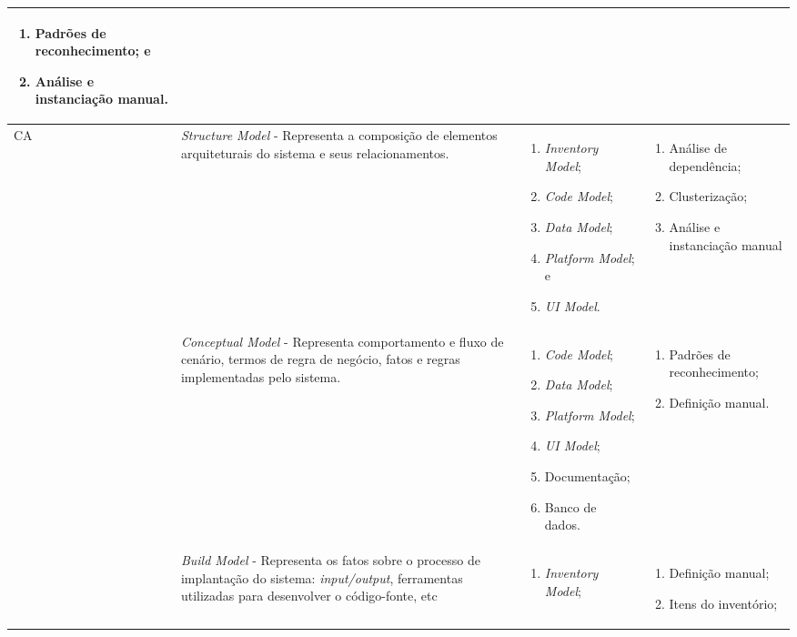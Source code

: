 \begin{longtable}{ | m{2.5cm} | m{5.9cm}| m{3.5cm} | m{3.5cm} | }
\begin{enumerate}
 	\item Padrões de reconhecimento; e
 	\item Análise e instanciação manual.
 \end{enumerate} \tabularnewline
\hline 
\multirow{3}{2.5cm}{CA} & \emph{Structure Model} \newline - Representa a composição de elementos arquiteturais do sistema e seus relacionamentos.  & \begin{enumerate}
	\item \emph{Inventory Model};
	\item \emph{Code Model};
	\item \emph{Data Model};
	\item \emph{Platform Model}; e
	\item \emph{UI Model}.
\end{enumerate} & \begin{enumerate}
	\item Análise de dependência;
	\item Clusterização; 
	\item Análise e instanciação manual
\end{enumerate}\tabularnewline
\cline{2-4} 
 & \emph{Conceptual Model} \newline - Representa comportamento e fluxo de cenário, termos de regra de negócio, fatos e regras implementadas pelo sistema.& \begin{enumerate}
 	\item \emph{Code Model};
 	\item \emph{Data Model};
 	\item \emph{Platform Model};
 	\item \emph{UI Model};
 	\item Documentação;
 	\item Banco de dados.
 \end{enumerate} & \begin{enumerate}
 	\item Padrões de reconhecimento;
 	\item Definição manual.
 \end{enumerate}\tabularnewline
\cline{2-4} 
 &  \emph{Build Model} \newline - Representa os fatos sobre o processo de implantação do sistema: \emph{input/output}, ferramentas utilizadas para desenvolver o código-fonte, etc & \begin{enumerate}
 	\item \emph{Inventory Model};
 \end{enumerate} & \begin{enumerate}
 	\item Definição manual;
 	\item Itens do inventório;
 \end{enumerate}\tabularnewline
\hline
 \end{longtable}

